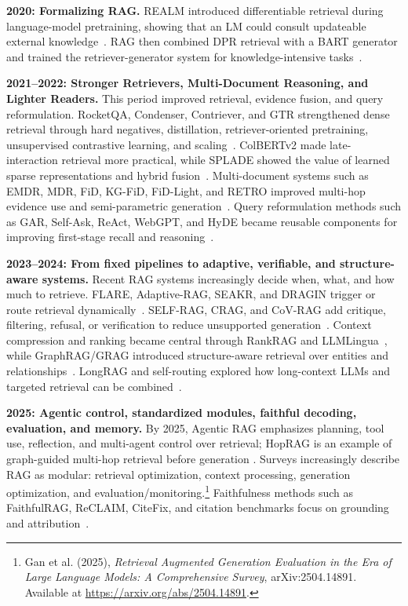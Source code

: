 \textbf{2020: Formalizing RAG.}
REALM introduced differentiable retrieval during language-model pretraining, showing that an LM could consult updateable external knowledge~\cite{realm2020}. RAG then combined DPR retrieval with a BART generator and trained the retriever-generator system for knowledge-intensive tasks~\cite{lewis2020rag}.

\textbf{2021--2022: Stronger Retrievers, Multi-Document Reasoning, and Lighter Readers.}
This period improved retrieval, evidence fusion, and query reformulation. RocketQA, Condenser, Contriever, and GTR strengthened dense retrieval through hard negatives, distillation, retriever-oriented pretraining, unsupervised contrastive learning, and scaling~\cite{rocketqa2021, condenser2021, contriever2021, gtr2021}. ColBERTv2 made late-interaction retrieval more practical, while SPLADE showed the value of learned sparse representations and hybrid fusion~\cite{colbertv2, splade2021}. Multi-document systems such as EMDR, MDR, FiD, KG-FiD, FiD-Light, and RETRO improved multi-hop evidence use and semi-parametric generation~\cite{emdr2021, mdr2020, fid2020, kgfid2021, fidlight2022, retro2021}. Query reformulation methods such as GAR, Self-Ask, ReAct, WebGPT, and HyDE became reusable components for improving first-stage recall and reasoning~\cite{gar2021, selfask2022, react2022, webgpt2021, hyde2022}.

\textbf{2023--2024: From fixed pipelines to adaptive, verifiable, and structure-aware systems.}
Recent RAG systems increasingly decide when, what, and how much to retrieve. FLARE, Adaptive-RAG, SEAKR, and DRAGIN trigger or route retrieval dynamically~\cite{flare2023, adaptive_rag2024, seakr2024, dragin2024}. SELF-RAG, CRAG, and CoV-RAG add critique, filtering, refusal, or verification to reduce unsupported generation~\cite{asai2023selfrag, crag2024, covrag2024, lmpriors2024}. Context compression and ranking became central through RankRAG and LLMLingua~\cite{rankrag2024, llmlingua2023}, while GraphRAG/GRAG introduced structure-aware retrieval over entities and relationships~\cite{grag2024}. LongRAG and self-routing explored how long-context LLMs and targeted retrieval can be combined~\cite{longrag2024, selfroute2024}.

\textbf{2025: Agentic control, standardized modules, faithful decoding, evaluation, and memory.}
By 2025, Agentic RAG emphasizes planning, tool use, reflection, and multi-agent control over retrieval; HopRAG is an example of graph-guided multi-hop retrieval before generation \cite{hoprag2025}. Surveys increasingly describe RAG as modular: retrieval optimization, context processing, generation optimization, and evaluation/monitoring.\footnote{Gan et al. (2025), \emph{Retrieval Augmented Generation Evaluation in the Era of Large Language Models: A Comprehensive Survey}, arXiv:2504.14891. Available at \url{https://arxiv.org/abs/2504.14891}.} Faithfulness methods such as FaithfulRAG, ReCLAIM, CiteFix, and citation benchmarks focus on grounding and attribution~\cite{faithfulrag2025, reclaim2024}.

